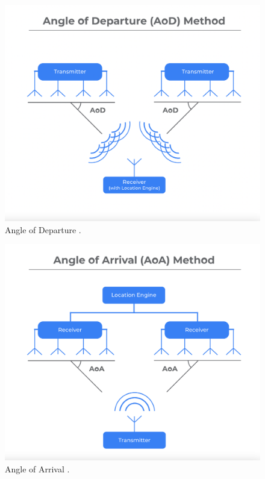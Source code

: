 \begin{figure}
    \includegraphics[width=\linewidth]{angle_of_departure_graphic.png}
    \caption[AoA]{Angle of Departure \autocite{Bluetooth2022}.}
    \label{fig:aop}
\end{figure}

\begin{figure}
    \includegraphics[width=\linewidth]{angle_of_arrival_graphic.png}
    \caption[AoD]{Angle of Arrival \autocite{Bluetooth2022}.}
    \label{fig:aoa}
\end{figure}

